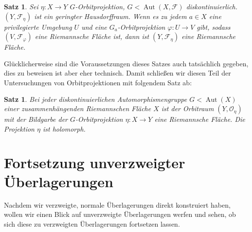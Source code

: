 \documentclass[12pt,a4paper]{article}
\theoremstyle{plain}
\newtheorem{Satz}[Theorem]{Satz}
\numberwithin{equation}{section}
\begin{document}
\begin{Satz} Sei $\eta: X\rightarrow Y$ $G$-Orbitprojektion, $G < \operatorname{Aut}(X,\mathcal{F})$ diskontinuierlich. $(Y,\mathcal{F}_\eta)$ ist ein geringter Hausdorffraum. Wenn es zu jedem $a\in X$ eine privilegierte Umgebung $U$ und eine $G_a$-Orbitprojektion $\varphi :U\rightarrow V$ gibt, sodass $(V,\mathcal{F}_\varphi)$ eine Riemannsche Fläche ist, dann ist $(Y,\mathcal{F}_\eta)$ eine Riemannsche Fläche.
\end{Satz}
Glücklicherweise sind die Voraussetzungen dieses Satzes auch tatsächlich gegeben, dies zu beweisen ist aber eher technisch. Damit schließen wir diesen Teil der Untersuchungen von Orbitprojektionen mit  folgendem Satz ab:
\begin{Satz} Bei jeder diskontinuierlichen Automorphismengruppe $G<\operatorname{Aut}(X)$ einer zusammenhängenden Riemannschen Fläche $X$ ist der Orbitraum $(Y,\mathcal{O}_\eta)$ mit der Bildgarbe der $G$-Orbitprojektion $\eta: X\rightarrow Y$ eine Riemannsche Fläche. Die Projektion $\eta$ ist holomorph.
\end{Satz}
\section{Fortsetzung unverzweigter Überlagerungen}
Nachdem wir verzweigte, normale Überlagerungen direkt konstruiert haben, wollen wir einen Blick auf unverzweigte Überlagerungen werfen und sehen, ob sich diese zu verzweigten Über\-la\-ge\-run\-gen fortsetzen lassen.
\end{document}

